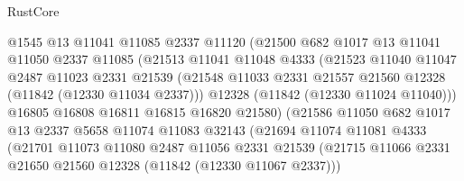 \begin{lexlean}{RustCore}
\begin{coremodule}
                          @1545
                          @13
                          @11041
                          @11085
                          @2337
                          @11120
                          (@21500
                            @682
                            @1017
                            @13
                            @11041
                            @11050
                            @2337
                            @11085
                            (@21513
                              @11041
                              @11048
                              @4333
                              (@21523
                                @11040
                                @11047
                                @2487
                                @11023
                                @2331
                                @21539
                                (@21548
                                  @11033
                                  @2331
                                  @21557
                                  @21560
                                  @12328
                                  (@11842 (@12330 @11034 @2337)))
                                @12328
                                (@11842 (@12330 @11024 @11040)))
                              @16805
                              @16808
                              @16811
                              @16815
                              @16820
                              @21580)
                            (@21586
                              @11050
                              @682
                              @1017
                              @13
                              @2337
                              @5658
                              @11074
                              @11083
                              @32143
                              (@21694
                                @11074
                                @11081
                                @4333
                                (@21701
                                  @11073
                                  @11080
                                  @2487
                                  @11056
                                  @2331
                                  @21539
                                  (@21715
                                    @11066
                                    @2331
                                    @21650
                                    @21560
                                    @12328
                                    (@11842 (@12330 @11067 @2337)))

\end{coremodule}
\end{lexlean}
